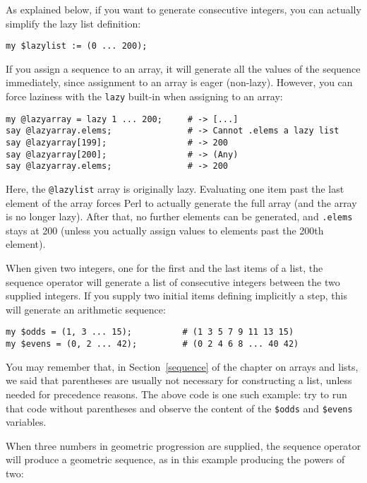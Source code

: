 As explained below, if you want to generate consecutive 
integers, you can actually simplify the lazy list definition:

\begin{verbatim}
my $lazylist := (0 ... 200);
\end{verbatim}


If you assign a sequence to an array, it will generate 
all the values of the sequence immediately, since 
assignment to an array is eager (non-lazy).  However, 
you can force laziness with the  {\tt lazy} built-in 
when assigning to an array:

\begin{verbatim}
my @lazyarray = lazy 1 ... 200;     # -> [...]
say @lazyarray.elems;               # -> Cannot .elems a lazy list
say @lazyarray[199];                # -> 200
say @lazyarray[200];                # -> (Any)
say @lazyarray.elems;               # -> 200
\end{verbatim}

Here, the \verb'@lazylist' array is originally lazy. 
Evaluating one item past the last element of the array 
forces Perl to actually generate the full array (and the 
array is no longer lazy). After that, no further elements 
can be generated, and {\tt .elems} stays at 200 (unless 
you actually assign values to elements past the 200th 
element).

When given two integers, one for the first and the last items of 
a list, the sequence operator will generate a list of consecutive 
integers between the two supplied integers. If you supply two 
initial items defining implicitly a step, this will generate 
an arithmetic sequence:

\begin{verbatim}
my $odds = (1, 3 ... 15);          # (1 3 5 7 9 11 13 15)
my $evens = (0, 2 ... 42);         # (0 2 4 6 8 ... 40 42)
\end{verbatim}

You may remember that, in Section~\ref{sequence} of the chapter 
on arrays and lists, we said that parentheses are usually not 
necessary for constructing a list, unless needed for 
precedence reasons. The above code is one such example: try 
to run that code without parentheses and observe the content 
of the \verb'$odds' and \verb'$evens' variables.

When three numbers in geometric progression are supplied, the 
sequence operator will produce a geometric sequence, as in 
this example producing the powers of two:

